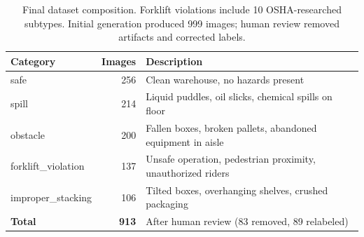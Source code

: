\documentclass[12pt, a4paper]{article}
\begin{document}
\begin{table}[H]
\centering
\begin{tabular}{lrl}
\toprule
\textbf{Category} & \textbf{Images} & \textbf{Description} \\
\midrule
safe & 256 & Clean warehouse, no hazards present \\
spill & 214 & Liquid puddles, oil slicks, chemical spills on floor \\
obstacle & 200 & Fallen boxes, broken pallets, abandoned equipment in aisle \\
forklift\_violation & 137 & Unsafe operation, pedestrian proximity, unauthorized riders \\
improper\_stacking & 106 & Tilted boxes, overhanging shelves, crushed packaging \\
\midrule
\textbf{Total} & \textbf{913} & After human review (83 removed, 89 relabeled) \\
\bottomrule
\end{tabular}
\caption{Final dataset composition. Forklift violations include 10 OSHA-researched subtypes. Initial generation produced 999 images; human review removed artifacts and corrected labels.}
\label{tab:dataset}
\end{table}
\end{document}
